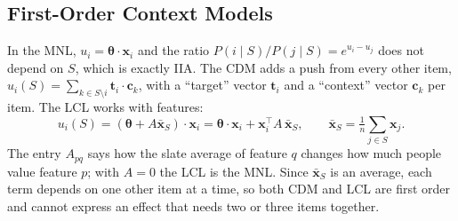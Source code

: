 \documentclass[11pt,a4paper]{article}
\numberwithin{table}{section}
\numberwithin{figure}{section}
\numberwithin{equation}{section}
\begin{document}
\subsection{First-Order Context Models}
In the MNL, $u_i=\bm\theta\cdot\mathbf x_i$ and the ratio $P(i\mid S)/P(j\mid S)=e^{u_i-u_j}$ does not depend on $S$, which is exactly IIA. The CDM \citep{seshadri2019} adds a push from every other item, $u_i(S)=\sum_{k\in S\setminus i}\mathbf t_i\cdot\mathbf c_k$, with a ``target'' vector $\mathbf t_i$ and a ``context'' vector $\mathbf c_k$ per item. The LCL \citep{tomlinson2021} works with features:
\begin{equation}\label{eq:lcl}
u_i(S)=(\bm\theta+A\bar{\mathbf x}_S)\cdot\mathbf x_i=\bm\theta\cdot\mathbf x_i+\mathbf x_i^{\top}A\,\bar{\mathbf x}_S,\qquad \bar{\mathbf x}_S=\tfrac1n\textstyle\sum_{j\in S}\mathbf x_j .
\end{equation}
The entry $A_{pq}$ says how the slate average of feature $q$ changes how much people value feature $p$; with $A=0$ the LCL is the MNL. Since $\bar{\mathbf x}_S$ is an average, each term depends on one other item at a time, so both CDM and LCL are first order and cannot express an effect that needs two or three items together.
\end{document}
